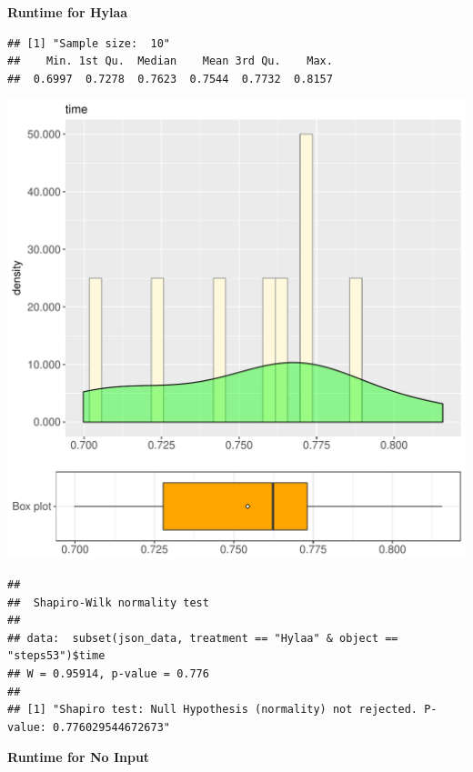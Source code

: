 \documentclass{article}\usepackage[]{graphicx}\usepackage[]{color}
\makeatletter
\def\maxwidth{ %
  \ifdim\Gin@nat@width>\linewidth
    \linewidth
  \else
    \Gin@nat@width
  \fi
}
\newenvironment{kframe}{%
 \def\at@end@of@kframe{}%
 \ifinner\ifhmode%
  \def\at@end@of@kframe{\end{minipage}}%
  \begin{minipage}{\columnwidth}%
 \fi\fi%
 \def\FrameCommand##1{\hskip\@totalleftmargin \hskip-\fboxsep
 \colorbox{shadecolor}{##1}\hskip-\fboxsep
     \hskip-\linewidth \hskip-\@totalleftmargin \hskip\columnwidth}%
 \MakeFramed {\advance\hsize-\width
   \@totalleftmargin\z@ \linewidth\hsize
   \@setminipage}}%
 {\par\unskip\endMakeFramed%
 \at@end@of@kframe}
\newenvironment{knitrout}{}{} %
\makeatother
\begin{document}
 \textbf{Runtime for Hylaa}
\begin{knitrout}
\color{fgcolor}\begin{kframe}
\begin{verbatim}
## [1] "Sample size:  10"
##    Min. 1st Qu.  Median    Mean 3rd Qu.    Max. 
##  0.6997  0.7278  0.7623  0.7544  0.7732  0.8157
\end{verbatim}
\end{kframe}
\includegraphics[width=\maxwidth]{figure/RH4_Hylaa_steps53-1} 
\begin{kframe}\begin{verbatim}
## 
## 	Shapiro-Wilk normality test
## 
## data:  subset(json_data, treatment == "Hylaa" & object == "steps53")$time
## W = 0.95914, p-value = 0.776
## 
## [1] "Shapiro test: Null Hypothesis (normality) not rejected. P-value: 0.776029544672673"
\end{verbatim}
\end{kframe}
\end{knitrout}
 \textbf{Runtime for No Input}
\end{document}
